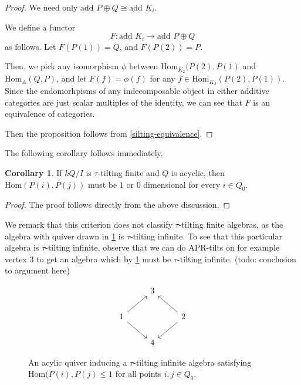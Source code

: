 \documentclass[]{article}
\theoremstyle{definition}
\newtheorem{corollary}{Corollary}[section]
\newcommand{\tu}{\ensuremath{\tau}}
\begin{document}
\begin{proof}
	We need only $\text{add } P\oplus Q \cong \text{add } K_i$.
	
	We define a functor \[F:\text{add } K_i \to \text{add } P\oplus Q\] as follows. Let $F(P(1)) = Q$, and $F(P(2)) = P$.
	
	Then, we pick any isomorphism $\phi$ between $\text{Hom}_{K_2}(P(2),P(1)$ and $\text{Hom}_{A}(Q,P)$, and let $F(f) = \phi(f)$ for any $f \in \text{Hom}_{K_2}(P(2),P(1))$. Since the endomorhpisms of any indecomposable object in either additive categories are just scalar multiples of the identity, we can see that $F$ is an equivalence of categories.
	
	Then the proposition follows from \cref{silting-equivalence}.
\end{proof}

The following corollary follows immediately.
\begin{corollary}\label{acyclic-tau-tilting-finite-critetion}
	If $kQ/I$ is $\tu$-tilting finite and $Q$ is acyclic, then $\text{Hom}(P(i),P(j))$ must be $1$ or $0$ dimensional for every $i \in Q_0$.
\end{corollary}

\begin{proof}
	The proof follows directly from the above discussion.
\end{proof}

We remark that this criterion does not classify $\tu$-tilting finite algebras, as the algebra with quiver drawn in \cref{counterexample-acyclic} is $\tu$-tilting infinite. To see that this particular algebra is $\tu$-tilting infinite, observe that we can do APR-tilts on for example vertex $3$ to get an algebra which by \cref{acyclic-tau-tilting-finite-critetion} must be \tu-tilting infinite. (todo: conclusion to argument here)
\begin{figure}[h]
\[\begin{tikzcd}
	& 3 \\
	1 && 2 \\
	& 4
	\arrow[from=2-3, to=3-2]
	\arrow[from=2-3, to=1-2]
	\arrow[from=2-1, to=1-2]
	\arrow[from=2-1, to=3-2]
\end{tikzcd}\]
\caption{An acylic quiver inducing a \tu-tilting infinite algebra satisfying $\text{Hom}(P(i),P(j) \leq 1$ for all points $i,j \in Q_0$.}
\label{counterexample-acyclic}
\end{figure}



\printbibliography
\end{document}
